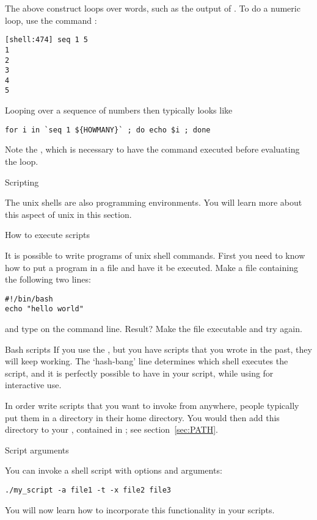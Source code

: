 The above construct loops over words, such as the output of
. To do a numeric loop, use the command :
\begin{verbatim}
[shell:474] seq 1 5
1
2
3
4
5
\end{verbatim}
Looping over a sequence of numbers then typically looks like
\begin{verbatim}
for i in `seq 1 ${HOWMANY}` ; do echo $i ; done
\end{verbatim}
Note the , which is necessary to have the 
command executed before evaluating the loop.

 {Scripting}
\label{sec:unix-script}

The unix shells are also programming environments. You will learn more
about this aspect of unix in this section.

 {How to execute scripts}
\label{sec:shell-scripting}

It is possible to write programs of unix shell commands. First you
need to know how to put a program in a file and have it be
executed. Make a file  containing the following two lines:
\begin{verbatim}
#!/bin/bash
echo "hello world"
\end{verbatim}
and type  on the command line. Result?
Make the file executable and try again.

\begin{zshnote}{Bash scripts}
  If you use the , but you have  scripts
  that you wrote in the past, they will keep working.
  The `hash-bang' line determines which shell executes the script,
  and it is perfectly possible to have  in your script,
  while using  for interactive use.
\end{zshnote}

In order write scripts that you want to invoke from anywhere, people
typically put them in a directory  in their home directory.
You would then add this directory to your ,
contained in ; see section~\ref{sec:PATH}.

 {Script arguments}

You can invoke a shell script with options and arguments:
\begin{verbatim}
./my_script -a file1 -t -x file2 file3
\end{verbatim}

You will now learn how to incorporate this functionality in your scripts.

